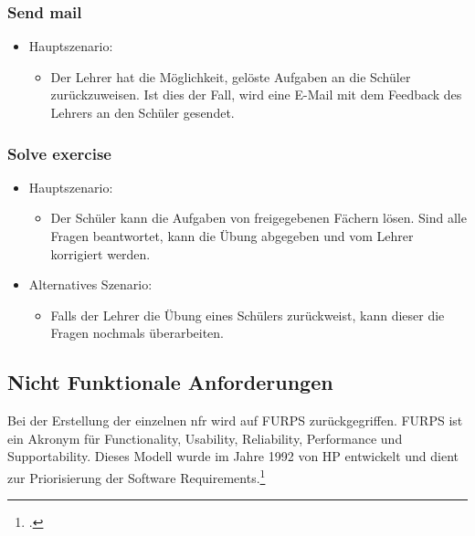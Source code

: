 \subsubsection*{Send mail}
\begin{itemize}
	\item Hauptszenario:
	\begin{itemize}
		\item Der Lehrer hat die Möglichkeit, gelöste Aufgaben an die Schüler zurückzuweisen. Ist dies der Fall, wird eine E-Mail mit dem Feedback des Lehrers an den Schüler gesendet.
	\end{itemize}
\end{itemize}


\subsubsection*{Solve exercise}
\begin{itemize}
	\item Hauptszenario:
	\begin{itemize}
		\item Der Schüler kann die Aufgaben von freigegebenen Fächern lösen. Sind alle Fragen beantwortet, kann die Übung abgegeben und vom Lehrer korrigiert werden.
	\end{itemize}
	\item Alternatives Szenario:
	\begin{itemize}
		\item Falls der Lehrer die Übung eines Schülers zurückweist, kann dieser die Fragen nochmals überarbeiten.
	\end{itemize}
\end{itemize}


\subsection{Nicht Funktionale Anforderungen}
\label{chapter_nfr}
Bei der Erstellung der einzelnen \gls{nfr} wird auf FURPS zurückgegriffen. FURPS ist ein Akronym für Functionality, Usability, Reliability, Performance und Supportability. Dieses Modell wurde im Jahre 1992 von HP entwickelt und dient zur Priorisierung der Software Requirements.\footcite{furps_description}

